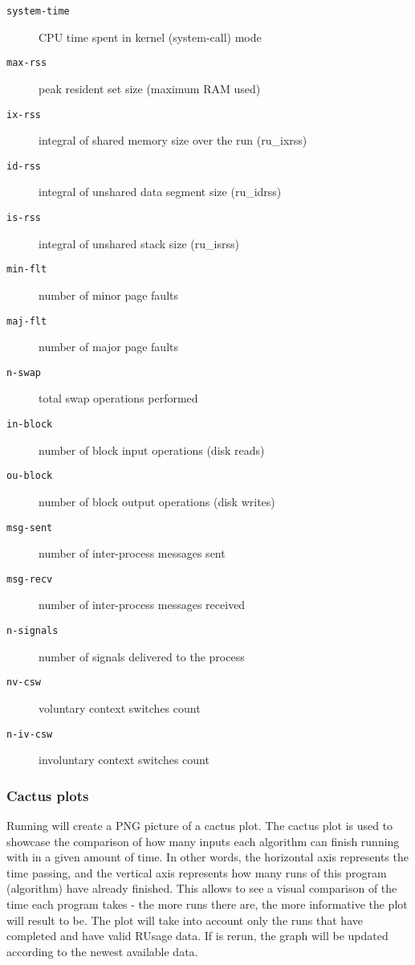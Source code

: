 \documentclass[a4paper,english]{article}
\begin{document}
\begin{adjustwidth}{18pt}{0pt}
\begin{description}
                    \item[\texttt{system-time}] CPU time spent in kernel (system-call) mode
                    \item[\texttt{max-rss}] peak resident set size (maximum RAM used)
                    \item[\texttt{ix-rss}] integral of shared memory size over the run (ru\_ixrss)
                    \item[\texttt{id-rss}] integral of unshared data segment size (ru\_idrss)
                    \item[\texttt{is-rss}] integral of unshared stack size (ru\_isrss)
                    \item[\texttt{min-flt}] number of minor page faults
                    \item[\texttt{maj-flt}] number of major page faults
                    \item[\texttt{n-swap}] total swap operations performed
                    \item[\texttt{in-block}] number of block input operations (disk reads)
                    \item[\texttt{ou-block}] number of block output operations (disk writes)
                    \item[\texttt{msg-sent}] number of inter-process messages sent
                    \item[\texttt{msg-recv}] number of inter-process messages received
                    \item[\texttt{n-signals}] number of signals delivered to the process
                    \item[\texttt{nv-csw}] voluntary context switches count
                    \item[\texttt{n-iv-csw}] involuntary context switches count
                \end{description}

            \subsubsection{Cactus plots}
                Running    will create a PNG picture of
                a cactus plot.
                The cactus plot is used to showcase the comparison of how many inputs each algorithm
                can finish running with in a given amount of time.
                In other words, the horizontal axis represents the time passing, and the vertical axis
                represents how many runs of this program (algorithm) have already finished.
                This allows to see a visual comparison of the time each program takes - the more runs
                there are, the more informative the plot will result to be.
                The plot will take into account only the runs that have completed and have valid
                RUsage data. If    is rerun, the graph will be updated
                according to the newest available data.


\end{adjustwidth}
\end{document}
